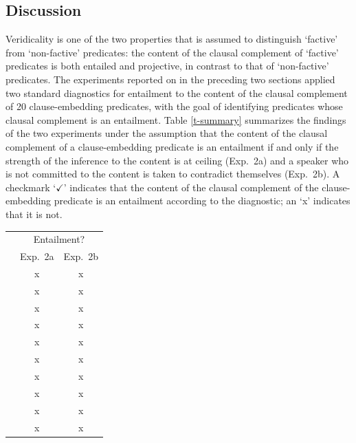 \documentclass[11pt,fleqn]{article}
\newcommand{\6}{\mbox{$[\hspace*{-.6mm}[$}}
\newcommand{\9}{\mbox{$]\hspace*{-.6mm}]$}}
\begin{document}
{\subsection{Discussion}\label{s33}

Veridicality is one of the two properties that is assumed to distinguish `factive' from `non-factive' predicates: the content of the clausal complement of `factive' predicates is both entailed and projective, in contrast to that of `non-factive' predicates. The experiments reported on in the preceding two sections applied two standard diagnostics for entailment to the content of the clausal complement of 20 clause-embedding predicates, with the goal of identifying predicates whose clausal complement is an entailment. Table \ref{t-summary} summarizes the findings of the two experiments under the assumption that the content of the clausal complement of a clause-embedding predicate is an entailment if and only if the strength of the inference to the content is at ceiling (Exp.~2a) and a speaker who is not committed to the content is taken to contradict themselves (Exp.~2b). A checkmark `$\checkmark$' indicates that the content of the clausal complement of the clause-embedding predicate is an entailment according to the diagnostic; an `x' indicates that it is not.

\begin{table}[H]
\setlength\tabcolsep{3pt}

\centering
\small

\begin{tabular}{l c c}
\toprule
& \multicolumn{2}{c}{Entailment?} \\ 
& Exp.~2a & Exp.~2b \\ 

\midrule
\color{brown}{\em think}\color{black}		&  x &   x  \\ 
\color{brown}{\em pretend}\color{black}	&    x  &   x  \\ 
\color{brown}{\em hear}\color{black}		&    x  &   x  \\ 
\color{brown}{\em suggest}	\color{black}&    x  &   x  \\
\color{brown}{\em say}\color{black}		&    x  &   x  \\ 
\color{black}{\em announce}\color{black}	&    x  &   x  \\ 
\color{black}{\em inform}\color{black}		&    x  &   x  \\ 
\color{black}{\em confess}\color{black}		&   x  &   x  \\ 
\color{blue}{\em reveal}\color{black}		&    x  &   x  \\ 
\color{airforceblue}{\em demonstrate}\color{black} &	  x  &   x  \\ 



\end{tabular}
\end{table}}
\end{document}

